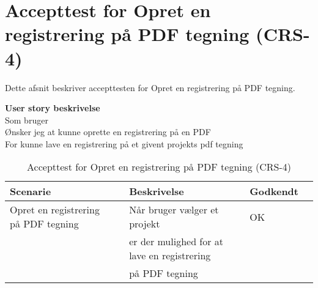 \section{Accepttest for Opret en registrering på PDF tegning (CRS-4)}
Dette afsnit beskriver accepttesten for Opret en registrering på PDF tegning.

\textbf{User story beskrivelse} \\
Som bruger \\
Ønsker jeg at kunne oprette en registrering på en PDF \\
For kunne lave en registrering på et givent projekts pdf tegning

\begin{table}[H]
	\centering
	\begin{tabular}{|ll|l|ll|} \hline
		\textbf{Scenarie} &  & \textbf{Beskrivelse}&  \textbf{Godkendt}&  \\ \hline
		Opret en registrering på PDF tegning&  &  Når bruger vælger et projekt &  OK&  \\
		& & er der mulighed for at lave en registrering& & \\ 
			& & på PDF tegning& & \\ \hline
	\end{tabular}
	\caption{Accepttest for Opret en registrering på PDF tegning (CRS-4)}
	\label{AcceptPDF}
\end{table}

\clearpage